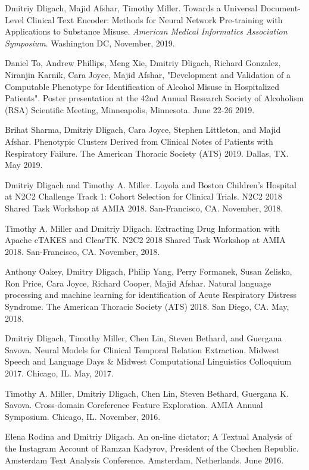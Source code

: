 \documentclass[letterpaper]{article}
\renewenvironment{itemize}{
  \begin{list}{}{
    \setlength{\leftmargin}{1.5em}
  }
}{
  \end{list}
}
\begin{document}
\begin{itemize}
\item Dmitriy Dligach, Majid Afshar, Timothy Miller. Towards a Universal Document-Level Clinical Text Encoder: Methods for Neural Network Pre-training with Applications to Substance Misuse. \emph{American Medical Informatics Association Symposium}. Washington DC, November, 2019.
\item Daniel To, Andrew Phillips, Meng Xie, Dmitriy Dligach, Richard Gonzalez, Niranjin Karnik, Cara Joyce, Majid Afshar, "Development and Validation of a Computable Phenotype for Identification of Alcohol Misuse in Hospitalized Patients". Poster presentation at the 42nd Annual Research Society of Alcoholism (RSA) Scientific Meeting, Minneapolis, Minnesota. June 22-26 2019.
\item Brihat Sharma, Dmitriy Dligach, Cara Joyce, Stephen Littleton, and Majid Afshar. Phenotypic Clusters Derived from Clinical Notes of Patients with Respiratory Failure. The American Thoracic Society (ATS) 2019. Dallas, TX. May 2019.
\item Dmitriy Dligach and Timothy A. Miller. Loyola and Boston Children's Hospital at N2C2 Challenge Track 1: Cohort Selection for Clinical Trials. N2C2 2018 Shared Task Workshop at AMIA 2018. San-Francisco, CA. November, 2018.
\item Timothy A. Miller and Dmitriy Dligach. Extracting Drug Information with Apache cTAKES and ClearTK. N2C2 2018 Shared Task Workshop at AMIA 2018. San-Francisco, CA. November, 2018.
\item Anthony Oakey, Dmitry Dligach, Philip Yang, Perry Formanek, Susan Zelisko, Ron Price, Cara Joyce, Richard Cooper, Majid Afshar. Natural language processing and machine learning for identification of Acute Respiratory Distress Syndrome. The American Thoracic Society (ATS) 2018. San Diego, CA. May, 2018.
\item Dmitriy Dligach, Timothy Miller, Chen Lin, Steven Bethard, and Guergana Savova. Neural Models for Clinical Temporal Relation Extraction. Midwest Speech and Language Days \& Midwest Computational Linguistics Colloquium 2017. Chicago, IL. May, 2017.
\item Timothy A. Miller, Dmitriy Dligach, Chen Lin, Steven Bethard, Guergana K. Savova. Cross-domain Coreference Feature Exploration. AMIA Annual Symposium. Chicago, IL. November, 2016.
\item Elena Rodina and Dmitriy Dligach. An on-line dictator; A Textual Analysis of the Instagram Account of Ramzan Kadyrov, President of the Chechen Republic. Amsterdam Text Analysis Conference. Amsterdam, Netherlands. June 2016.

\end{itemize}
\end{document}
